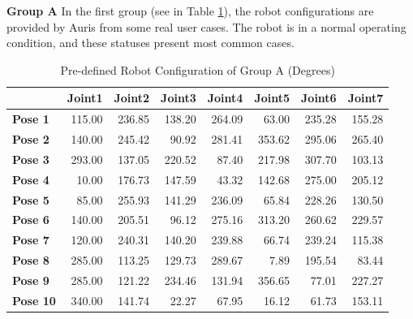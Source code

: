 \textbf{Group A}
In the first group (see in Table \ref{table-groupA}), the robot configurations are provided by Auris from some real user cases. The robot is in a normal operating condition, and these statuses present most common cases.

\begin{table}[]
	\centering
	\caption{Pre-defined Robot Configuration of Group A (Degrees)}
	\label{table-groupA}
	\begin{tabular}{|l|r|r|r|r|r|r|r|}
		\hline
		\textbf{} & \textbf{Joint1} & \textbf{Joint2} & \textbf{Joint3} & \textbf{Joint4} & \textbf{Joint5} & \textbf{Joint6} & \textbf{Joint7} \\ \hline
		\textbf{Pose 1}  & 115.00           & 236.85           & 138.20           & 264.09           & 63.00            & 235.28           & 155.28           \\ \hline
		\textbf{Pose 2}  & 140.00           & 245.42           & 90.92            & 281.41           & 353.62           & 295.06           & 265.40           \\ \hline
		\textbf{Pose 3}  & 293.00           & 137.05           & 220.52           & 87.40            & 217.98           & 307.70           & 103.13           \\ \hline
		\textbf{Pose 4}  & 10.00            & 176.73           & 147.59           & 43.32            & 142.68           & 275.00           & 205.12           \\ \hline
		\textbf{Pose 5}  & 85.00            & 255.93           & 141.29           & 236.09           & 65.84            & 228.26           & 130.50           \\ \hline
		\textbf{Pose 6}  & 140.00           & 205.51           & 96.12            & 275.16           & 313.20           & 260.62           & 229.57           \\ \hline
		\textbf{Pose 7}  & 120.00           & 240.31           & 140.20           & 239.88           & 66.74            & 239.24           & 115.38           \\ \hline
		\textbf{Pose 8}  & 285.00           & 113.25           & 129.73           & 289.67           & 7.89             & 195.54           & 83.44            \\ \hline
		\textbf{Pose 9}  & 285.00           & 121.22           & 234.46           & 131.94           & 356.65           & 77.01            & 227.27           \\ \hline
		\textbf{Pose 10} & 340.00           & 141.74           & 22.27            & 67.95            & 16.12            & 61.73            & 153.11           \\ \hline
	\end{tabular}
\end{table}



